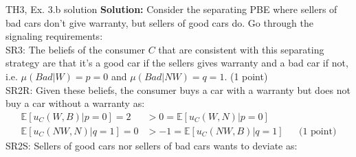 




\begin{frame}{TH3, Ex. 3.b solution}
  \textbf{Solution:} Consider the separating PBE where sellers of bad cars don't give warranty, but sellers of good cars do. Go through the signaling requirements:\\\smallskip
  SR3: The beliefs of the consumer $C$ that are consistent with this separating strategy are that it's a good car if the sellers gives warranty and a bad car if not, i.e. $\mu(Bad|W)=p=0$ and $\mu(Bad|NW)=q=1$. (1 point)\\\smallskip
  SR2R: Given these beliefs, the consumer buys a car with a warranty but does not buy a car without a warranty as:
  \begin{align*}
    \mathbb{E}[u_C(W,B)|p=0]=2&>0=\mathbb{E}[u_C(W,N)|p=0]\\
    \mathbb{E}[u_C(NW,N)|q=1]=0&>-1=\mathbb{E}[u_C(NW,B)|q=1]&&\text{(1 point)}
  \end{align*}
  SR2S: Sellers of good cars nor sellers of bad cars wants to deviate as:
  \begin{align*}
    
  \end{align*}
\end{frame}





